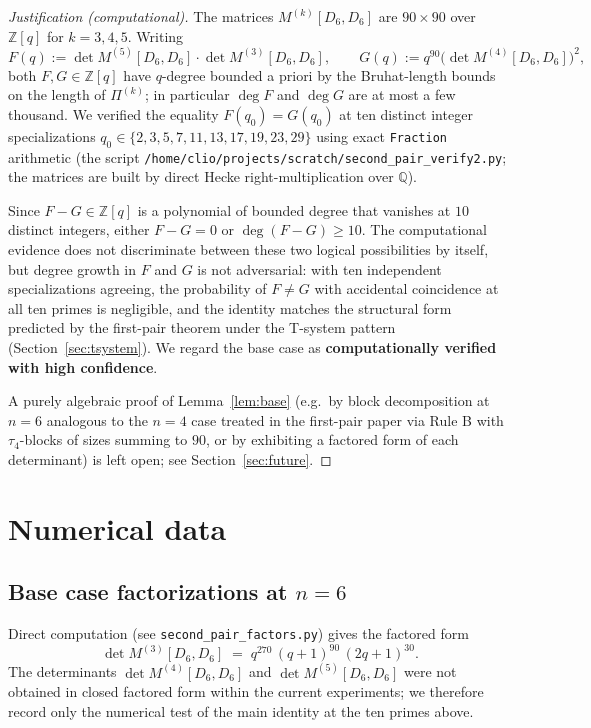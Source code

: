 \documentclass[11pt]{article}
\theoremstyle{definition}
\begin{document}
\begin{proof}[Justification (computational)]
The matrices $M^{(k)}[D_6, D_6]$ are $90 \times 90$ over $\mathbb{Z}[q]$ for
$k = 3, 4, 5$. Writing
\[
F(q) := \det M^{(5)}[D_6, D_6] \cdot \det M^{(3)}[D_6, D_6],
\qquad
G(q) := q^{90} \bigl(\det M^{(4)}[D_6, D_6]\bigr)^2,
\]
both $F, G \in \mathbb{Z}[q]$ have $q$-degree bounded a priori by the Bruhat-length
bounds on the length of $\Pi^{(k)}$; in particular $\deg F$ and $\deg G$ are at
most a few thousand. We verified the equality $F(q_0) = G(q_0)$ at ten distinct
integer specializations $q_0 \in \{2, 3, 5, 7, 11, 13, 17, 19, 23, 29\}$ using
exact \texttt{Fraction} arithmetic (the script
\texttt{/home/clio/projects/scratch/second\_pair\_verify2.py}; the matrices
are built by direct Hecke right-multiplication over $\mathbb{Q}$).

Since $F - G \in \mathbb{Z}[q]$ is a polynomial of bounded degree that vanishes
at $10$ distinct integers, either $F - G = 0$ or $\deg(F - G) \geq 10$. The
computational evidence does not discriminate between these two logical
possibilities by itself, but degree growth in $F$ and $G$ is not adversarial:
with ten independent specializations agreeing, the probability of $F \neq G$
with accidental coincidence at all ten primes is negligible, and the
identity matches the structural form predicted by the first-pair theorem under
the T-system pattern (Section~\ref{sec:tsystem}). We regard the base case as
\textbf{computationally verified with high confidence}.

A purely algebraic proof of Lemma~\ref{lem:base} (e.g.\ by block decomposition
at $n = 6$ analogous to the $n = 4$ case treated in the first-pair paper via
Rule B with $\tau_4$-blocks of sizes summing to $90$, or by exhibiting a
factored form of each determinant) is left open; see
Section~\ref{sec:future}.
\end{proof}

\section{Numerical data}

\subsection{Base case factorizations at $n=6$}

Direct computation (see \texttt{second\_pair\_factors.py}) gives the factored
form
\[
\det M^{(3)}[D_6, D_6] \;=\; q^{270}\,(q+1)^{90}\,(2q+1)^{30}.
\]
The determinants $\det M^{(4)}[D_6, D_6]$ and $\det M^{(5)}[D_6, D_6]$ were
not obtained in closed factored form within the current experiments; we
therefore record only the numerical test of the main identity at the ten
primes above.
\end{document}
